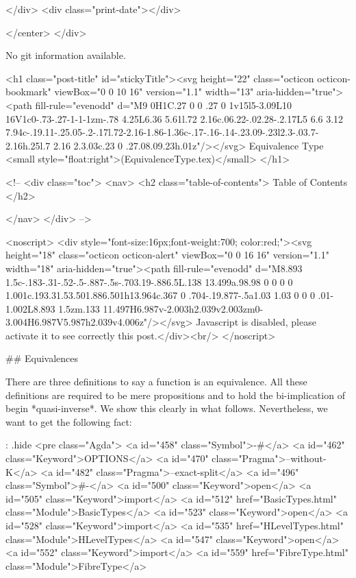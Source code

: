           
        </div>
        <div class="print-date"></div>
        
        
    </center>
  </div>

  
  No git information available.
  

  <h1 class="post-title" id="stickyTitle"><svg height="22" class="octicon octicon-bookmark" viewBox="0 0 10 16" version="1.1" width="13" aria-hidden="true"><path fill-rule="evenodd" d="M9 0H1C.27 0 0 .27 0 1v15l5-3.09L10 16V1c0-.73-.27-1-1-1zm-.78 4.25L6.36 5.61l.72 2.16c.06.22-.02.28-.2.17L5 6.6 3.12 7.94c-.19.11-.25.05-.2-.17l.72-2.16-1.86-1.36c-.17-.16-.14-.23.09-.23l2.3-.03.7-2.16h.25l.7 2.16 2.3.03c.23 0 .27.08.09.23h.01z"/></svg> Equivalence Type <small style="float:right">(EquivalenceType.tex)</small>
  </h1>

  <!-- 
  <div class="toc">
    <nav>
    <h2 class="table-of-contents"> Table of Contents </h2>
      

    </nav>
  </div>
   -->

  <noscript>
  <div style="font-size:16px;font-weight:700; color:red;"><svg height="18" class="octicon octicon-alert" viewBox="0 0 16 16" version="1.1" width="18" aria-hidden="true"><path fill-rule="evenodd" d="M8.893 1.5c-.183-.31-.52-.5-.887-.5s-.703.19-.886.5L.138 13.499a.98.98 0 0 0 0 1.001c.193.31.53.501.886.501h13.964c.367 0 .704-.19.877-.5a1.03 1.03 0 0 0 .01-1.002L8.893 1.5zm.133 11.497H6.987v-2.003h2.039v2.003zm0-3.004H6.987V5.987h2.039v4.006z"/></svg> Javascript is disabled, please activate it to see correctly this post.</div><br/>
  </noscript>

  ## Equivalences

There are three definitions to say a function is an equivalence. All these
definitions are required to be mere propositions and to hold the
bi-implication of begin *quasi-inverse*. We show this clearly in what follows.
Nevertheless, we want to get the following fact:


{: .hide}
<pre class="Agda">
<a id="458" class="Symbol">{-#</a> <a id="462" class="Keyword">OPTIONS</a> <a id="470" class="Pragma">--without-K</a> <a id="482" class="Pragma">--exact-split</a> <a id="496" class="Symbol">#-}</a>
<a id="500" class="Keyword">open</a> <a id="505" class="Keyword">import</a> <a id="512" href="BasicTypes.html" class="Module">BasicTypes</a>
<a id="523" class="Keyword">open</a> <a id="528" class="Keyword">import</a> <a id="535" href="HLevelTypes.html" class="Module">HLevelTypes</a>
<a id="547" class="Keyword">open</a> <a id="552" class="Keyword">import</a> <a id="559" href="FibreType.html" class="Module">FibreType</a>

